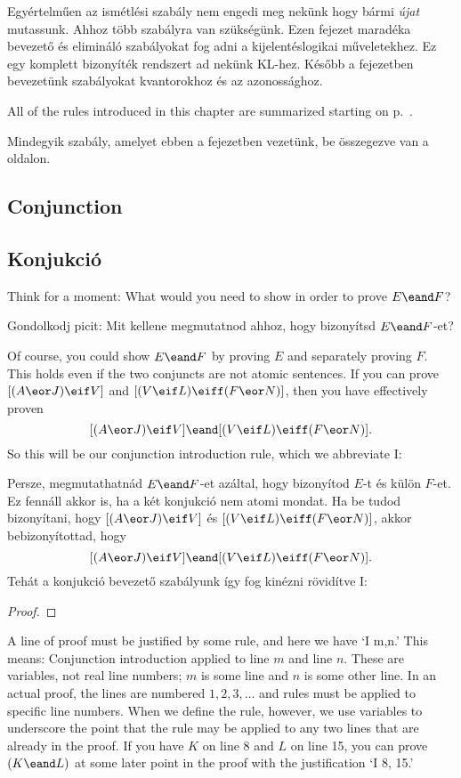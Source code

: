 Egyértelműen az ismétlési szabály nem engedi meg nekünk hogy bármi \emph{újat} mutassunk. Ahhoz több szabályra van szükségünk.
Ezen fejezet maradéka bevezető és elimináló szabályokat fog adni a kijelentéslogikai műveletekhez. Ez egy komplett bizonyíték rendszert ad nekünk KL-hez. Később a fejezetben bevezetünk szabályokat kvantorokhoz és az azonossághoz.

All of the rules introduced in this chapter are summarized starting on p.~\pageref{ProofRules}.

Mindegyik szabály, amelyet ebben a fejezetben vezetünk, be összegezve van a ~\pageref{ProofRules} oldalon.

\subsection*{Conjunction}
\subsection{Konjukció}

Think for a moment: What would you need to show in order to prove $E \eand F$?

Gondolkodj picit: Mit kellene megmutatnod ahhoz, hogy bizonyítsd $E \eand F$-et?

Of course, you could show $E \eand F$ by proving $E$ and separately proving $F$. 
This holds even if the two conjuncts are not atomic sentences. If you can prove $[(A \eor J) \eif V]$ and  $[(V \eif L) \eiff (F \eor N)]$, then you have effectively proven
$$[(A \eor J) \eif V] \eand [(V \eif L) \eiff (F \eor N)].$$
So this will be our conjunction introduction rule, which we abbreviate {\eand}I:

Persze, megmutathatnád $E \eand F$-et azáltal, hogy bizonyítod $E$-t és külön $F$-et.
Ez fennáll akkor is, ha a két konjukció nem atomi mondat. Ha be tudod bizonyítani, hogy  $[(A \eor J) \eif V]$ és  $[(V \eif L) \eiff (F \eor N)]$, akkor bebizonyítottad, hogy
$$[(A \eor J) \eif V] \eand [(V \eif L) \eiff (F \eor N)].$$
Tehát a konjukció bevezető szabályunk így fog kinézni rövidítve {\eand}I:
 
\begin{proof}
	 
\end{proof}

A line of proof must be justified by some rule, and here we have `{\eand}I m,n.' This means: Conjunction introduction applied to line $m$ and line $n$. These are variables, not real line numbers; $m$ is some line and $n$ is some other line. In an actual proof, the lines are numbered $1, 2, 3, \ldots$ and rules must be applied to specific line numbers. When we define the rule, however, we use variables to underscore the point that the rule may be applied to any two lines that are already in the proof. If you have $K$ on line 8 and $L$ on line 15, you can prove $(K\eand L)$ at some later point in the proof with the justification `{\eand}I 8, 15.'

